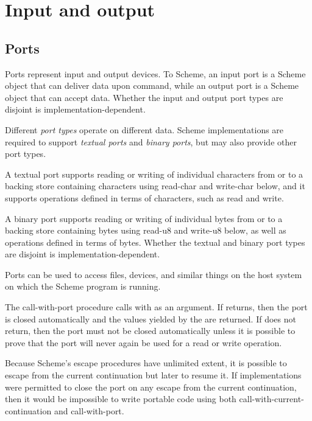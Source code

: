 \section{Input and output}

\subsection{Ports}
\label{portsection}

Ports represent input and output devices.  To Scheme, an input port is
a Scheme object that can deliver data upon command, while an output
port is a Scheme object that can accept data.
Whether the input and output port types are disjoint is
implementation-dependent.

Different {\em port types} operate on different data.  Scheme
imple\-men\-ta\-tions are required to support {\em textual ports}
and {\em binary ports}, but may also provide other port types.

A textual port supports reading or writing of individual characters
from or to a backing store containing characters
using {\cf read-char} and {\cf write-char} below, and it supports operations
defined in terms of characters, such as {\cf read} and {\cf write}.

A binary port supports reading or writing of individual bytes from
or to a backing store containing bytes using {\cf read-u8} and {\cf
write-u8} below, as well as operations defined in terms of bytes.
Whether the textual and binary port types are disjoint is
implementation-dependent.

Ports can be used to access files, devices, and similar things on the host
system on which the Scheme program is running.

\begin{entry}{%
}

The {\cf call-with-port}
procedure calls  with  as an argument.  
If  returns,
then the port is closed automatically and the values yielded by the
 are returned.  If  does not return, then 
the port must not be closed automatically unless it is possible to
prove that the port will never again be used for a read or write
operation.

\begin{rationale}
Because Scheme's escape procedures have unlimited extent, it  is
possible to escape from the current continuation but later to resume it. 
If implementations were permitted to close the port on any escape from the
current continuation, then it would be impossible to write portable code using
both {\cf call-with-current-continuation} and {\cf call-with-port}.
\end{rationale} 

\end{entry}

